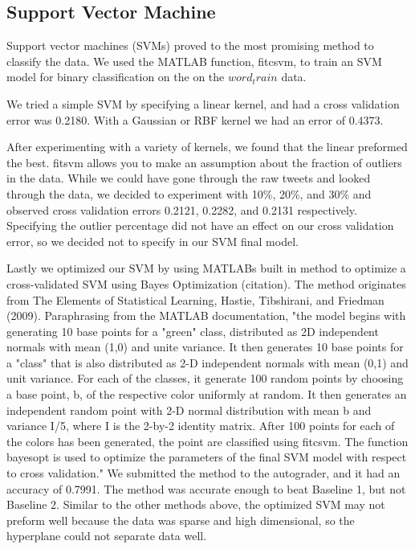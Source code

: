 \documentclass[]{article}
\begin{document}
\subsection{Support Vector Machine}

Support vector machines (SVMs) proved to the most promising method to classify the data. We used the MATLAB function, fitcsvm, to train an SVM model for binary classification on the on the $word_train$ data.

We tried a simple SVM by specifying a linear kernel, and had a  cross validation error was 0.2180. With a Gaussian or RBF kernel we had an error of 0.4373. 


After experimenting with a variety of kernels, we found that the linear preformed the best. fitsvm allows you to make an assumption about the fraction of outliers in the data. While we could have gone through the raw tweets and looked through the data, we decided to experiment with  10\%, 20\%, and 30\% and observed cross validation errors 0.2121, 0.2282, and 0.2131 respectively. Specifying the outlier percentage did not have an effect on our cross validation error, so we decided not to specify in our SVM final model. 

Lastly we optimized our SVM by using MATLABs built in method to optimize a cross-validated SVM using Bayes Optimization (citation). The method originates from The Elements of Statistical Learning, Hastie, Tibshirani, and Friedman (2009). Paraphrasing from the MATLAB documentation,  "the model begins with generating 10 base points for a "green" class, distributed as 2D independent normals with mean (1,0) and unite variance. It then generates 10 base points for a "class" that is also distributed as 2-D independent normals with mean (0,1) and unit variance. For each of the classes, it generate 100 random points by choosing a base point, b, of the respective color uniformly at random. It then generates an independent random point with 2-D normal distribution with mean b and variance I/5, where I is the 2-by-2 identity matrix. After 100 points for each of the colors has been generated, the point are classified using fitcsvm. The function bayesopt is used to optimize the parameters of the final SVM model with respect to cross validation." We submitted the method to the autograder, and it had an accuracy of 0.7991. The method was accurate enough to beat Baseline 1, but not Baseline 2. Similar to the other methods above, the optimized SVM may not preform well because the data was sparse and high dimensional, so the hyperplane could not separate data well. 
\end{document}
